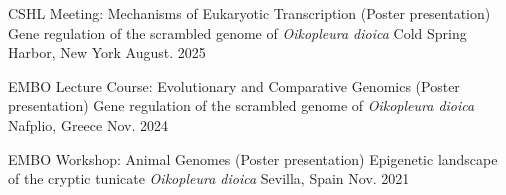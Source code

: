 



\begin{cventries}

  \cventrypub
    {CSHL Meeting: Mechanisms of Eukaryotic Transcription
    (Poster presentation)} %
    {Gene regulation of the scrambled genome of \textit{Oikopleura dioica}} %
    {Cold Spring Harbor, New York} %
    {August. 2025} %

  \cventrypub
    {EMBO Lecture Course: Evolutionary and Comparative Genomics
    (Poster presentation)} %
    {Gene regulation of the scrambled genome of \textit{Oikopleura dioica}} %
    {Nafplio, Greece} %
    {Nov. 2024} %

  \cventrypub
    {EMBO Workshop: Animal Genomes (Poster presentation)} %
    {Epigenetic landscape of the cryptic tunicate \textit{Oikopleura dioica}} %
    {Sevilla, Spain} %
    {Nov. 2021} %
  

\end{cventries}



